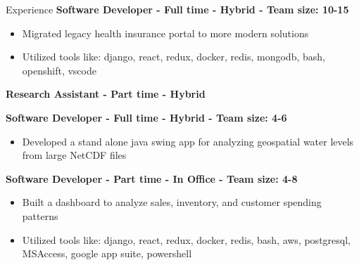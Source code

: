 \documentclass{resume} %
\begin{document}
\begin{rSection}{Experience}
\textbf{Software Developer - Full time - Hybrid - Team size: 10-15} \\

\begin{itemize}
  \itemsep -2pt {}
      \item Migrated legacy health insurance portal to more modern solutions
    \item Utilized tools like: django, react, redux, docker, redis, mongodb, bash, openshift, vscode
\end{itemize}

\textbf{Research Assistant - Part time - Hybrid} \\


\textbf{Software Developer - Full time - Hybrid - Team size: 4-6} \\

\begin{itemize}
  \itemsep -2pt {}
      \item Developed a stand alone java swing app for analyzing geospatial water levels from large NetCDF files
\end{itemize}

\textbf{Software Developer - Part time - In Office - Team size: 4-8} \\

\begin{itemize}
  \itemsep -2pt {}
      \item Built a dashboard to analyze sales, inventory, and customer spending patterns
    \item Utilized tools like: django, react, redux, docker, redis, bash, aws, postgresql, MSAccess, google app suite, powershell
\end{itemize}

\end{rSection}

\end{document}
